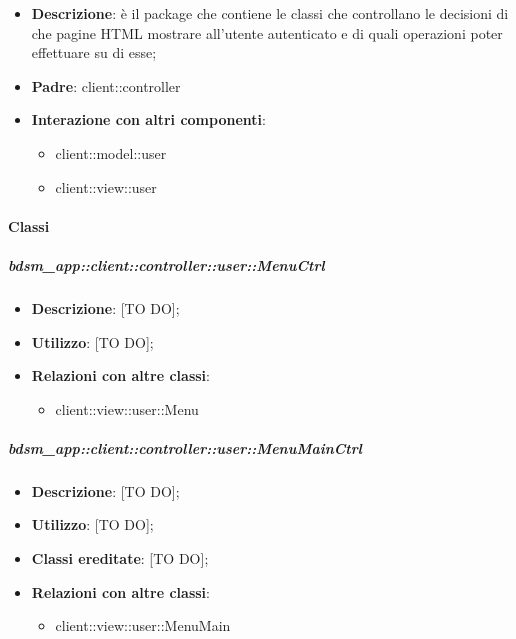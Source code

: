 \begin{itemize}
	\item \textbf{Descrizione}: è il package che contiene le classi che controllano le decisioni di che pagine HTML mostrare all'utente autenticato e di quali operazioni poter effettuare su di esse;
	\item \textbf{Padre}: client::controller
	\item \textbf{Interazione con altri componenti}:
		\begin{itemize}
			\item client::model::user
			\item client::view::user
		\end{itemize}
\end{itemize}

	\paragraph{Classi} %
		\subparagraph{bdsm\_app::client::controller::user::MenuCtrl} %
		\label{subp:client_controller_user_menuctrl}
			\begin{itemize}
				\item \textbf{Descrizione}: [TO DO];
				\item \textbf{Utilizzo}: [TO DO];
				\item \textbf{Relazioni con altre classi}:
					\begin{itemize}
						\item client::view::user::Menu
					\end{itemize}
			\end{itemize}

		\subparagraph{bdsm\_app::client::controller::user::MenuMainCtrl} %
		\label{subp:client_controller_user_menumainctrl}
			\begin{itemize}
				\item \textbf{Descrizione}: [TO DO];
				\item \textbf{Utilizzo}: [TO DO];
				\item \textbf{Classi ereditate}: [TO DO];
				\item \textbf{Relazioni con altre classi}:
					\begin{itemize}
						\item client::view::user::MenuMain
					\end{itemize}
			\end{itemize}

